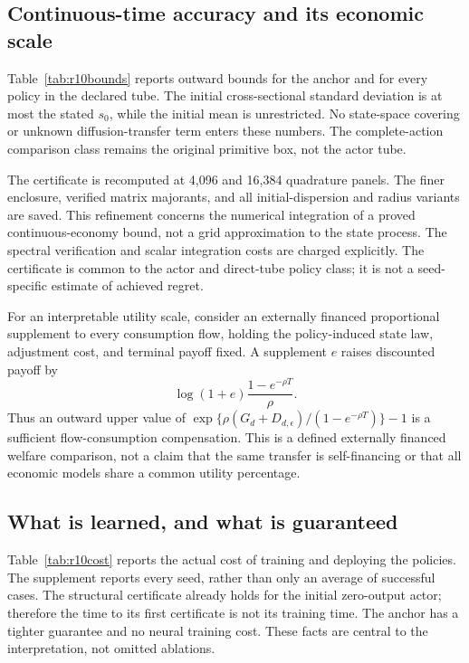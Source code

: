 \subsection{Continuous-time accuracy and its economic scale}
Table~\ref{tab:r10bounds} reports outward bounds for the anchor and for every policy in the declared tube. The initial cross-sectional standard deviation is at most the stated $s_0$, while the initial mean is unrestricted. No state-space covering or unknown diffusion-transfer term enters these numbers. The complete-action comparison class remains the original primitive box, not the actor tube.


The certificate is recomputed at 4,096 and 16,384 quadrature panels. The finer enclosure, verified matrix majorants, and all initial-dispersion and radius variants are saved. This refinement concerns the numerical integration of a proved continuous-economy bound, not a grid approximation to the state process. The spectral verification and scalar integration costs are charged explicitly. The certificate is common to the actor and direct-tube policy class; it is not a seed-specific estimate of achieved regret.

For an interpretable utility scale, consider an externally financed proportional supplement to every consumption flow, holding the policy-induced state law, adjustment cost, and terminal payoff fixed. A supplement $e$ raises discounted payoff by
\[
 \log(1+e)\frac{1-e^{-\rho T}}{\rho}.
\]
Thus an outward upper value of
$\exp\{\rho(G_d+D_{d,\epsilon})/(1-e^{-\rho T})\}-1$
is a sufficient flow-consumption compensation. This is a defined externally financed welfare comparison, not a claim that the same transfer is self-financing or that all economic models share a common utility percentage.

\subsection{What is learned, and what is guaranteed}
Table~\ref{tab:r10cost} reports the actual cost of training and deploying the policies. The supplement reports every seed, rather than only an average of successful cases. The structural certificate already holds for the initial zero-output actor; therefore the time to its first certificate is not its training time. The anchor has a tighter guarantee and no neural training cost. These facts are central to the interpretation, not omitted ablations.


